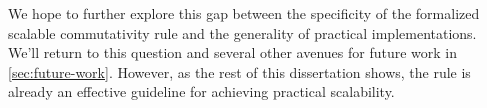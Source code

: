 We hope to further explore this gap between the specificity of the
formalized scalable commutativity rule and the generality of practical
implementations.
%
We'll return to this question and several other avenues for future
work in \cref{sec:future-work}.
%
However, as the rest of this dissertation shows, the rule is already
an effective guideline for achieving practical scalability.





